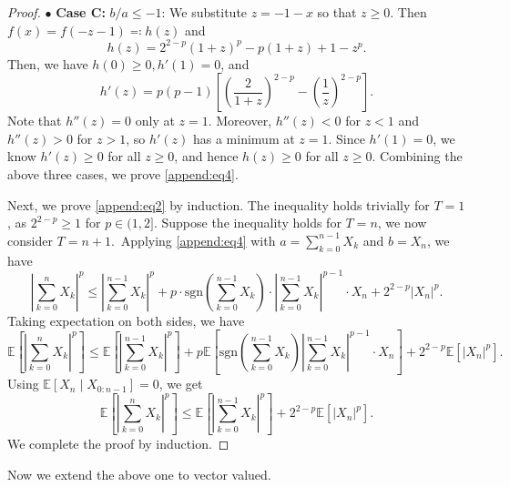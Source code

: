\documentclass{article}
\theoremstyle{plain}
\theoremstyle{definition}
\theoremstyle{remark}
\begin{document}
\begin{proof}
\vskip4pt
\noindent$\bullet$ \textbf{Case C:} $b/a \leq -1$: We substitute $z = -1 - x $ so that $z\geq 0$. Then $f(x)=f(-z-1)\eqqcolon h(z)$ and \vspace{-0.2cm}
\begin{equation*}
h(z) = 2^{2-p} (1 + z)^p - p (1 + z) + 1 - z^p.
\end{equation*}
Then, we have $h(0) \geq 0, h'(1) = 0$, and  \vspace{-0.2cm}
\begin{equation*}
h'(z) = p (p-1) \left[ \left( \frac{2}{1 + z} \right)^{2-p} - \left( \frac{1}{z} \right)^{2-p} \right].
\end{equation*}
Note that $ h''(z) = 0 $ only at $ z = 1$. Moreover, $ h''(z) < 0 $ for $ z < 1 $ and $ h''(z) > 0 $ for $ z > 1 $, so $ h'(z) $ has a minimum at $z = 1 $. Since $ h'(1) = 0 $, we know $ h'(z) \geq 0 $ for all $z \geq 0 $, and hence $ h(z) \geq 0 $ for all $z \geq 0$. Combining the above three cases, we prove \eqref{append:eq4}.

Next, we prove \eqref{append:eq2} by induction. The inequality holds trivially for $T=1$, as $2^{2-p} \geq 1$ for $p \in (1,2] $. Suppose the inequality holds for $T=n$, we now consider $T=n+1$.~Applying \eqref{append:eq4} with $a =  \sum_{k=0}^{n-1} X_k $ and $b = X_{n}$, we have
\begin{equation*}
\left| \sum_{k=0}^{n} X_k \right| ^{p} \leq  \left| \sum_{k=0}^{n-1} X_k \right| ^{p} + p\cdot \text{sgn}(\sum_{k=0}^{n-1} X_k) \cdot \left| \sum_{k=0}^{n-1} X_k \right|^{p-1} \cdot X_{n} + 2^{2-p}  |X_{n}|^p .
\end{equation*}
Taking expectation on both sides, we have
\begin{equation*}
\mathbb{E}\left[ \left| \sum_{k=0}^{n} X_k \right| ^{p} \right] \leq  \mathbb{E}\left[  \left| \sum_{k=0}^{n-1} X_k \right| ^{p} \right] + p \mathbb{E}\left[  \text{sgn}(\sum_{k=0}^{n-1} X_k) \left| \sum_{k=0}^{n-1} X_k \right|^{p-1} \cdot X_{n}  \right]  + 2^{2-p}  \mathbb{E}\left[  |X_{n}|^p \right]  .
\end{equation*}
Using $\mathbb{E}[X_{n}\mid X_{0:n-1}]=0$, we get
\begin{equation*}
\mathbb{E}\left[ \left| \sum_{k=0}^{n} X_k \right| ^{p} \right] \leq  \mathbb{E}\left[  \left| \sum_{k=0}^{n-1} X_k \right| ^{p} \right] + 2^{2-p}  \mathbb{E}\left[  |X_{n}|^p \right] .
\end{equation*}
We complete the proof by induction.
\end{proof}

Now we extend the above one to vector valued.


\end{document}
